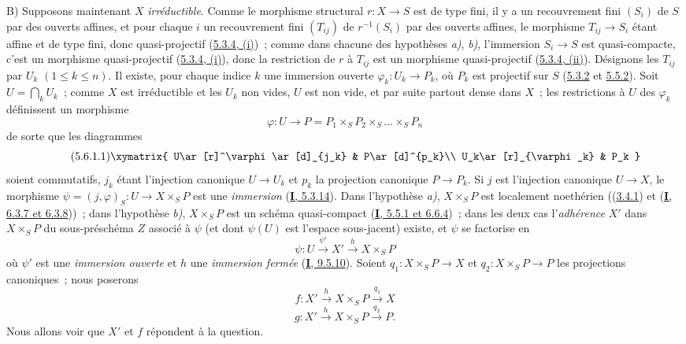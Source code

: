 B) Supposons maintenant $X$ \emph{irréductible}. Comme le morphisme structural
$r:X\to S$ est de type fini, il y a un recouvrement fini $(S_i)$ de $S$ par
des ouverts affines, et pour chaque $i$ un recouvrement fini $(T_{ij})$ de
$r^{-1}(S_i)$ par des ouverts affines, le morphisme $T_{ij}\to S_i$ étant
affine et de type fini, donc quasi-projectif
(\hyperref[II.5.3.4-fr]{5.3.4, (i)})~; comme dans chacune des hypothèses \emph{a)},
\emph{b)}, l'immersion $S_i\to S$ est quasi-compacte, c'est un morphisme
quasi-projectif (\hyperref[II.5.3.4-fr]{5.3.4, (i)}), donc la restriction de
$r$ à $T_{ij}$ est un morphisme quasi-projectif
(\hyperref[II.5.3.4-fr]{5.3.4, (ii)}). Désignons les $T_{ij}$ par $U_k$
$(1\leq k\leq n)$. Il existe, pour chaque indice $k$ une immersion ouverte
$\varphi_k:U_k\to P_k$, où $P_k$ est projectif sur $S$
(\hyperref[II.5.3.2-fr]{5.3.2} et \hyperref[II.5.5.2-fr]{5.5.2}). Soit
$U=\bigcap_kU_k$~; comme $X$ est irréductible et les $U_k$ non vides, $U$ est
non vide, et par suite partout dense dans $X$~; les restrictions à $U$ des
$\varphi_k$ définissent un morphisme
\[
\varphi:U\to P=P_1\times_SP_2\times_S\ldots\times_SP_n
\]
de sorte que les diagrammes
\[
\tag{5.6.1.1}
\label{II.5.6.1.1-fr}
\xymatrix{
U\ar[r]^\varphi\ar[d]_{j_k} & P\ar[d]^{p_k}\\
U_k\ar[r]_{\varphi_k} & P_k
}
\]
soient commutatifs, $j_k$ étant l'injection canonique $U\to U_k$ et $p_k$ la
projection canonique $P\to P_k$. Si $j$ est l'injection canonique $U\to X$,
le morphisme $\psi=(j,\varphi)_S:U\to X\times_SP$ est une \emph{immersion}
(\hyperref[I.5.3.14-fr]{\textbf{I}, 5.3.14}). Dans l'hypothèse \emph{a)}, $X\times_SP$ est
localement noethérien ((\hyperref[II.3.4.1-fr]{3.4.1}) et
(\hyperref[I.6.3.7-fr]{\textbf{I}, 6.3.7 et 6.3.8}))~; dans l'hypothèse \emph{b)},
$X\times_SP$ est un schéma quasi-compact
(\hyperref[I.5.5.1-fr]{\textbf{I}, 5.5.1 et 6.6.4})~; dans les deux cas l'\emph{adhérence}
$X'$ dans $X\times_SP$ du sous-préschéma $Z$ associé à $\psi$ (et dont
$\psi(U)$ est l'espace sous-jacent) existe, et $\psi$ se factorise en
\[
\tag{5.6.1.2}
\label{II.5.6.1.2-fr}
\psi:U\xrightarrow{\psi'}X'\xrightarrow{h}X\times_SP
\]
où $\psi'$ est une \emph{immersion ouverte} et $h$ une \emph{immersion fermée}
(\hyperref[I.9.5.10-fr]{\textbf{I}, 9.5.10}). Soient
$q_1:X\times_SP\to X$ et $q_2:X\times_SP\to P$ les projections canoniques~;
nous poserons
\[
\tag{5.6.1.3}
\label{II.5.6.1.3-fr}
f:X'\xrightarrow{h}X\times_SP\xrightarrow{q_1}X
\]
\[
\tag{5.6.1.4}
\label{II.5.6.1.4-fr}
g:X'\xrightarrow{h}X\times_SP\xrightarrow{q_2}P.
\]
Nous allons voir que $X'$ et $f$ répondent à la question.

